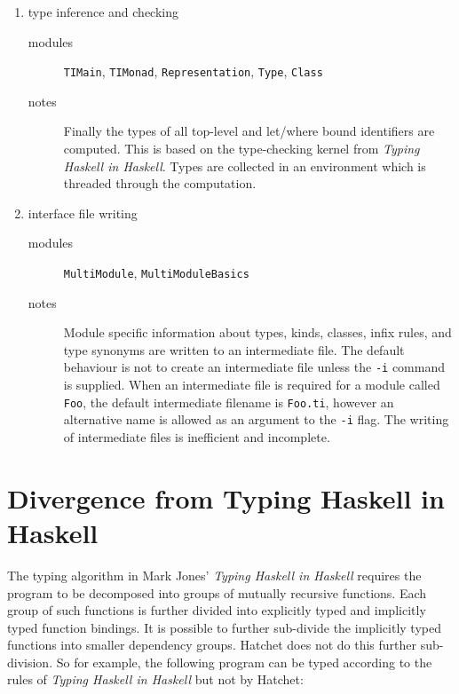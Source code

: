 \documentclass{article}
\begin{document}
\begin{enumerate}
\begin{description}
      \end{description}
\item type inference and checking 
     \begin{description}
     \item[modules] \texttt{TIMain}, \texttt{TIMonad}, \texttt{Representation},
     \texttt{Type}, \texttt{Class}
     \item[notes] Finally the types of all top-level and let/where bound
                  identifiers are computed. This is based on the type-checking
                  kernel from \emph{Typing Haskell in Haskell}. Types are 
                  collected in an environment which is threaded through the
                  computation. 
     \end{description}
\item interface file writing 
     \begin{description}
     \item[modules] \texttt{MultiModule}, \texttt{MultiModuleBasics}
     \item[notes] Module specific information about types, kinds, classes,
                 infix rules, and type synonyms
                  are written to an intermediate file. The default behaviour
                  is not to create an intermediate file unless the \texttt{-i}
                command is supplied. When an intermediate file is required for
                a module called \texttt{Foo}, the default intermediate filename
                is \texttt{Foo.ti}, however an alternative name is allowed
                as an argument to the \texttt{-i} flag. The writing of intermediate
                files is inefficient and incomplete. 
     \end{description}
\end{enumerate}

\section{Divergence from Typing Haskell in Haskell}

The typing algorithm in Mark Jones' \emph{Typing Haskell 
in Haskell} requires the program to be decomposed into 
groups of mutually recursive functions. Each group of such
functions is further divided into explicitly typed and
implicitly typed function bindings. It is possible to 
further sub-divide the implicitly typed functions into
smaller dependency groups. Hatchet does not do this
further sub-division. So for example, the following 
program can be typed according to the rules of 
\emph{Typing Haskell in Haskell} but not by Hatchet:
\end{document}
